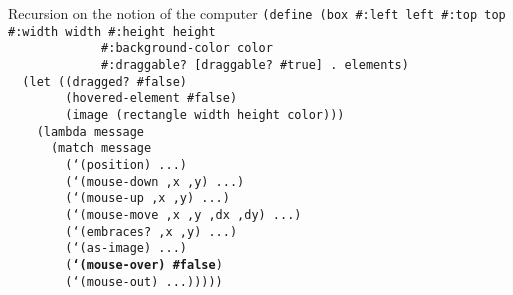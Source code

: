 \begin{frame}{Recursion on the notion of the computer}
  \tiny
  \texttt{(define (box \#:left left \#:top top \#:width width \#:height height\\
    \ \ \ \ \ \ \ \ \ \ \ \ \ \#:background-color color\\
    \ \ \ \ \ \ \ \ \ \ \ \ \ \#:draggable? [draggable? \#true] . elements)\\
    \ \ (let ((dragged? \#false)\\
    \ \ \ \ \ \ \ \ (hovered-element \#false)\\
    \ \ \ \ \ \ \ \ (image (rectangle width height color)))\\
    \ \ \ \ (lambda message\\
    \ \ \ \ \ \ (match message\\
    \ \ \ \ \ \ \ \ (`(position) ...)\\
    \ \ \ \ \ \ \ \ (`(mouse-down ,x ,y) ...)\\
    \ \ \ \ \ \ \ \ (`(mouse-up ,x ,y) ...)\\
    \ \ \ \ \ \ \ \ (`(mouse-move ,x ,y ,dx ,dy) ...)\\
    \ \ \ \ \ \ \ \ (`(embraces? ,x ,y) ...)\\
    \ \ \ \ \ \ \ \ (`(as-image) ...)\\
    \ \ \ \ \ \ \ \ (\textbf{`(mouse-over) \#false})\\
    \ \ \ \ \ \ \ \ (`(mouse-out) ...)))))\\
    \ \\
    \ \\
    \ \\
    \ \\
    \ \\
    \ \\
    \ \\
    \ \\
    \ \\
    \ \\
    \ \\
    \ 
    }
\end{frame}

